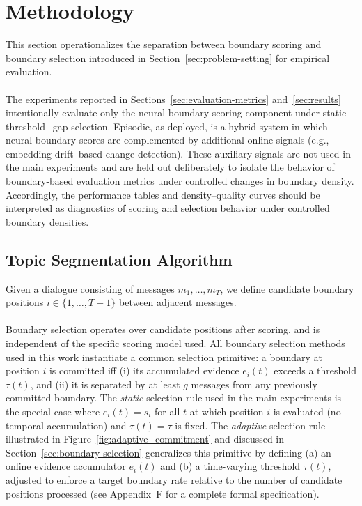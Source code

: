 \documentclass{article}
\makeatletter
\newcommand{\myparagraph}[1]{%
  \paragraph{\@addpunct{#1}}%
}
\makeatother
\begin{document}
\section{Methodology}

This section operationalizes the separation between boundary scoring
and boundary selection introduced in
Section~\ref{sec:problem-setting} for empirical evaluation.

\myparagraph{Experimental scope} The experiments reported in
Sections~\ref{sec:evaluation-metrics} and~\ref{sec:results}
intentionally evaluate only the neural boundary scoring component
under static threshold\(+\)gap selection. Episodic, as deployed, is a
hybrid system in which neural boundary scores are complemented by
additional online signals (e.g., embedding-drift–based change
detection).
These auxiliary signals are not used in the main experiments and are
held out deliberately to isolate the behavior of boundary-based
evaluation metrics under controlled changes in boundary
density. Accordingly, the performance tables and density--quality
curves should be interpreted as diagnostics of scoring and selection
behavior under controlled boundary densities.


\subsection{Topic Segmentation Algorithm}

Given a dialogue consisting of messages $m_1,\dots,m_T$, we define
candidate boundary positions $i \in \{1,\dots,T-1\}$ between adjacent
messages.

\myparagraph{Selection rule family}
Boundary selection operates over candidate positions after scoring,
and is independent of the specific scoring model used. All boundary
selection methods used in this work instantiate a common selection
primitive: a boundary at position $i$ is committed iff (i) its
accumulated evidence $e_i(t)$ exceeds a threshold $\tau(t)$, and (ii)
it is separated by at least $g$ messages from any previously committed
boundary. The \emph{static} selection rule used in the main experiments
is the special case where $e_i(t) = s_i$ for all $t$ at which position
$i$ is evaluated (no temporal accumulation) and $\tau(t)=\tau$ is
fixed. The \emph{adaptive} selection rule illustrated in
Figure~\ref{fig:adaptive_commitment} and discussed in
Section~\ref{sec:boundary-selection} generalizes this primitive by
defining (a) an online evidence accumulator $e_i(t)$ and (b) a
time-varying threshold $\tau(t)$, adjusted to enforce a target
boundary rate relative to the number of candidate positions processed
(see Appendix~F for a complete formal specification).
\end{document}
